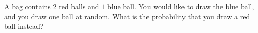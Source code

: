 A bag contains $2$ red balls and $1$ blue ball. You would like to draw the blue ball, and you draw one ball at random. What is the probability that you draw a red ball instead?

